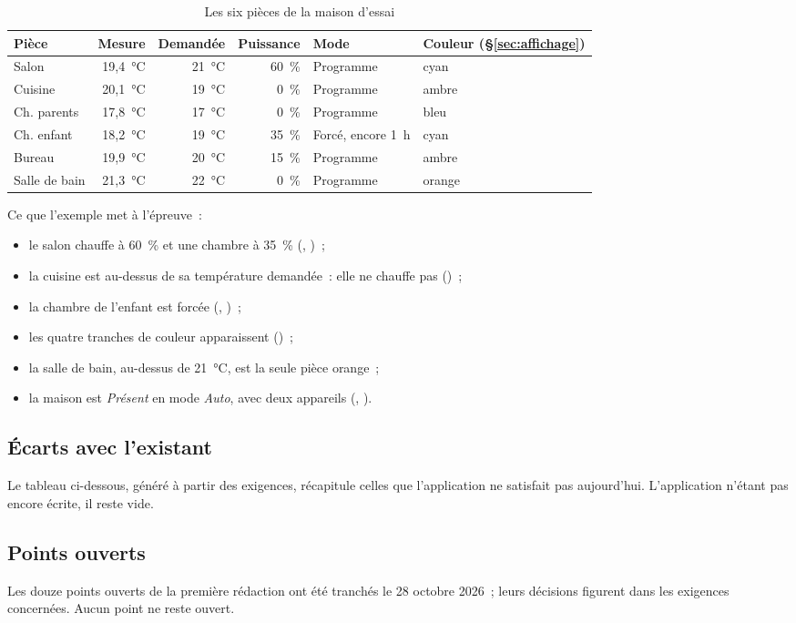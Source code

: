 \begin{table}[H]
  \centering\small
  \begin{tabularx}{\linewidth}{@{}lrrrlX@{}}
    \toprule
    \textbf{Pièce} & \textbf{Mesure} & \textbf{Demandée} & \textbf{Puissance} & \textbf{Mode} & \textbf{Couleur (§\ref{sec:affichage})} \\
    \midrule
    Salon         & 19,4~°C & 21~°C & 60~\% & Programme       & cyan \\
    Cuisine       & 20,1~°C & 19~°C & 0~\%  & Programme       & ambre \\
    Ch. parents   & 17,8~°C & 17~°C & 0~\%  & Programme       & bleu \\
    Ch. enfant    & 18,2~°C & 19~°C & 35~\% & Forcé, encore 1~h & cyan \\
    Bureau        & 19,9~°C & 20~°C & 15~\% & Programme       & ambre \\
    Salle de bain & 21,3~°C & 22~°C & 0~\%  & Programme       & orange \\
    \bottomrule
  \end{tabularx}
  \caption{Les six pièces de la maison d'essai}
  \label{tab:maison-essai}
\end{table}

Ce que l'exemple met à l'épreuve~:
\begin{itemize}
  \item le salon chauffe à 60~\% et une chambre à 35~\% (,
        )~;
  \item la cuisine est au-dessus de sa température demandée~: elle ne chauffe pas
        ()~;
  \item la chambre de l'enfant est forcée (, )~;
  \item les quatre tranches de couleur apparaissent ()~;
  \item la salle de bain, au-dessus de 21~°C, est la seule pièce orange~;
  \item la maison est \emph{Présent} en mode \emph{Auto}, avec deux appareils
        (, ).
\end{itemize}

\subsection{Écarts avec l'existant}
\label{sec:ecarts}

Le tableau ci-dessous, généré à partir des exigences, récapitule celles que l'application
ne satisfait pas aujourd'hui. L'application n'étant pas encore écrite, il reste vide.

\listeecarts

\subsection{Points ouverts}
\label{sec:points-ouverts}

Les douze points ouverts de la première rédaction ont été tranchés le 28 octobre 2026~;
leurs décisions figurent dans les exigences concernées. Aucun point ne reste ouvert.
